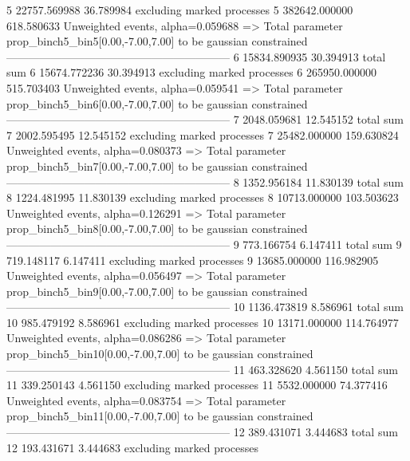 5          22757.569988    36.789984       excluding marked processes    
5          382642.000000   618.580633      Unweighted events, alpha=0.059688
  => Total parameter prop_binch5_bin5[0.00,-7.00,7.00] to be gaussian constrained
------------------------------------------------------------
6          15834.890935    30.394913       total sum                     
6          15674.772236    30.394913       excluding marked processes    
6          265950.000000   515.703403      Unweighted events, alpha=0.059541
  => Total parameter prop_binch5_bin6[0.00,-7.00,7.00] to be gaussian constrained
------------------------------------------------------------
7          2048.059681     12.545152       total sum                     
7          2002.595495     12.545152       excluding marked processes    
7          25482.000000    159.630824      Unweighted events, alpha=0.080373
  => Total parameter prop_binch5_bin7[0.00,-7.00,7.00] to be gaussian constrained
------------------------------------------------------------
8          1352.956184     11.830139       total sum                     
8          1224.481995     11.830139       excluding marked processes    
8          10713.000000    103.503623      Unweighted events, alpha=0.126291
  => Total parameter prop_binch5_bin8[0.00,-7.00,7.00] to be gaussian constrained
------------------------------------------------------------
9          773.166754      6.147411        total sum                     
9          719.148117      6.147411        excluding marked processes    
9          13685.000000    116.982905      Unweighted events, alpha=0.056497
  => Total parameter prop_binch5_bin9[0.00,-7.00,7.00] to be gaussian constrained
------------------------------------------------------------
10         1136.473819     8.586961        total sum                     
10         985.479192      8.586961        excluding marked processes    
10         13171.000000    114.764977      Unweighted events, alpha=0.086286
  => Total parameter prop_binch5_bin10[0.00,-7.00,7.00] to be gaussian constrained
------------------------------------------------------------
11         463.328620      4.561150        total sum                     
11         339.250143      4.561150        excluding marked processes    
11         5532.000000     74.377416       Unweighted events, alpha=0.083754
  => Total parameter prop_binch5_bin11[0.00,-7.00,7.00] to be gaussian constrained
------------------------------------------------------------
12         389.431071      3.444683        total sum                     
12         193.431671      3.444683        excluding marked processes    
